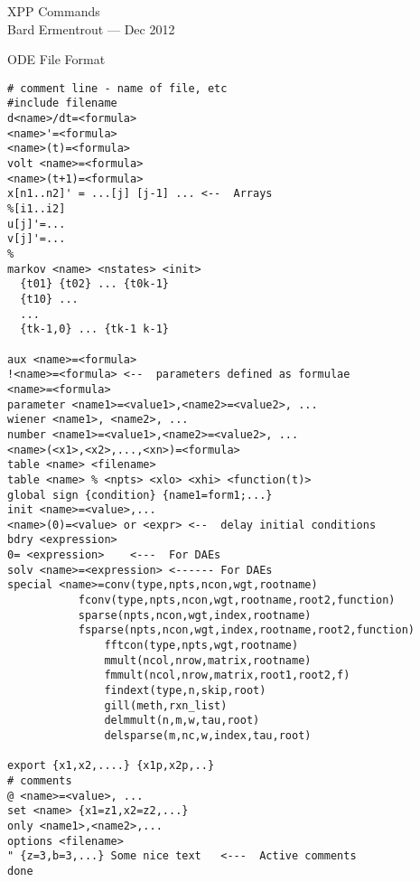 \setlength{\topmargin}{-.5 in}
\setlength{\oddsidemargin}{ 0.1 in}
\setlength{\textheight}{ 8.75 in}
\setlength{\textwidth}{6.8in}
\newcommand{\beq}{\begin{equation}}
\newcommand{\eeq}{\end{equation}}
\newcommand{\beqa}{\begin{eqnarray}}
\newcommand{\eeqa}{\end{eqnarray}}
\newcommand{\bvb}{\begin{verbatim}}
\newcommand{\evb}{\end{verbatim}}
\newcommand{\beqann}{\begin{eqnarray*}}
\newcommand{\eeqann}{\end{eqnarray*}}
\newcommand{\nn}{\mbox{${\nonumber}$}}
\newcommand{\labeq}[1]{\label{eq:#1}}
\newcommand{\refeq}[1]{(\ref{eq:#1})}

\begin{center} {\Large XPP Commands} \\
Bard Ermentrout   ---  Dec 2012
\end{center}

\begin{center} {\large ODE File Format}\end{center}
\begin{verbatim}
# comment line - name of file, etc
#include filename   
d<name>/dt=<formula>
<name>'=<formula>
<name>(t)=<formula>
volt <name>=<formula>
<name>(t+1)=<formula>
x[n1..n2]' = ...[j] [j-1] ... <--  Arrays
%[i1..i2]
u[j]'=...
v[j]'=...
% 
markov <name> <nstates> <init>
  {t01} {t02} ... {t0k-1}
  {t10} ...
  ...
  {tk-1,0} ... {tk-1 k-1}

aux <name>=<formula>
!<name>=<formula> <--  parameters defined as formulae
<name>=<formula>
parameter <name1>=<value1>,<name2>=<value2>, ...
wiener <name1>, <name2>, ...
number <name1>=<value1>,<name2>=<value2>, ...
<name>(<x1>,<x2>,...,<xn>)=<formula>
table <name> <filename>
table <name> % <npts> <xlo> <xhi> <function(t)>
global sign {condition} {name1=form1;...}
init <name>=<value>,...
<name>(0)=<value> or <expr> <--  delay initial conditions
bdry <expression>
0= <expression>    <---  For DAEs
solv <name>=<expression> <------ For DAEs
special <name>=conv(type,npts,ncon,wgt,rootname)
	       fconv(type,npts,ncon,wgt,rootname,root2,function)
	       sparse(npts,ncon,wgt,index,rootname)
	       fsparse(npts,ncon,wgt,index,rootname,root2,function)
               fftcon(type,npts,wgt,rootname)
               mmult(ncol,nrow,matrix,rootname)
               fmmult(ncol,nrow,matrix,root1,root2,f)
               findext(type,n,skip,root)
               gill(meth,rxn_list)
               delmmult(n,m,w,tau,root)
               delsparse(m,nc,w,index,tau,root)
          
export {x1,x2,....} {x1p,x2p,..}     
# comments
@ <name>=<value>, ...
set <name> {x1=z1,x2=z2,...}
only <name1>,<name2>,...
options <filename>
" {z=3,b=3,...} Some nice text   <---  Active comments 
done
\end{verbatim}


